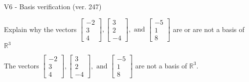 \begin{exercise}
  \begin{exerciseTitle}V6 - Basis verification (ver. 247)\end{exerciseTitle}
  \begin{exerciseStatement}
    Explain why the vectors \(\left[\begin{array}{r}
-2 \\
3 \\
4
\end{array}\right] , \left[\begin{array}{r}
3 \\
2 \\
-4
\end{array}\right] , \text{ and } \left[\begin{array}{r}
-5 \\
1 \\
8
\end{array}\right]\) are or are not a basis of \(\mathbb{R}^3\)	


  \end{exerciseStatement}
  \begin{exerciseAnswer}
   The vectors \(\left[\begin{array}{r}
-2 \\
3 \\
4
\end{array}\right] , \left[\begin{array}{r}
3 \\
2 \\
-4
\end{array}\right] , \text{ and } \left[\begin{array}{r}
-5 \\
1 \\
8
\end{array}\right]\) 
  	 are not  a basis of \(\mathbb{R}^3\).
  


  \end{exerciseAnswer}
\end{exercise}